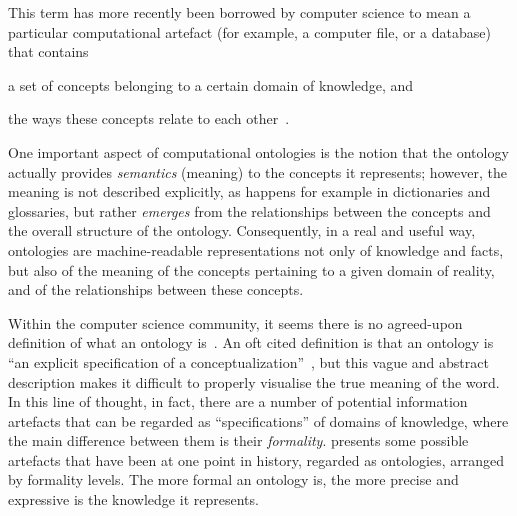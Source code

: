 This term has more recently been borrowed by computer science to mean a particular computational artefact (for example, a computer file, or a database) that contains
\begin{paralist}
    \item a set of concepts belonging to a certain domain of knowledge, and
    \item the ways these concepts relate to each other~\citep{Gruber1993}.
\end{paralist}
One important aspect of computational ontologies is the notion that the ontology actually provides \emph{semantics} (\ie meaning) to the concepts it represents; however, the meaning is not described explicitly, as happens for example in dictionaries and glossaries, but rather \emph{emerges} from the relationships between the concepts and the overall structure of the ontology. Consequently, in a real and useful way, ontologies are machine-readable representations not only of knowledge and facts, but also of the meaning of the concepts pertaining to a given domain of reality, and of the relationships between these concepts.

Within the computer science community, it seems there is no agreed-upon definition of what an ontology is~\citep{Guarino1998}. An oft cited definition is that an ontology is ``an explicit specification of a conceptualization''~\citep{Gruber1993}, but this vague and abstract description makes it difficult to properly visualise the true meaning of the word. In this line of thought, in fact, there are a number of potential information artefacts that can be regarded as ``specifications'' of domains of knowledge, where the main difference between them is their \emph{formality}.  presents some possible artefacts that have been at one point in history, regarded as ontologies, arranged by formality levels. The more formal an ontology is, the more precise and expressive is the knowledge it represents.


